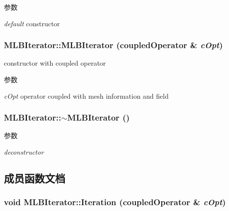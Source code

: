 \begin{DoxyParams}{参数}
\item[{\em default}]constructor \end{DoxyParams}
\hypertarget{classMLBIterator_a3ebc135eabdafb635d1b07b7138d5312}{
\subsubsection[{MLBIterator}]{\setlength{\rightskip}{0pt plus 5cm}MLBIterator::MLBIterator (coupledOperator \& {\em cOpt})}}
\label{classMLBIterator_a3ebc135eabdafb635d1b07b7138d5312}


constructor with coupled operator 
\begin{DoxyParams}{参数}
\item[{\em cOpt}]operator coupled with mesh information and field \end{DoxyParams}
\hypertarget{classMLBIterator_adf1f2571a69820fefe660ad605b4378b}{
\subsubsection[{$\sim$MLBIterator}]{\setlength{\rightskip}{0pt plus 5cm}MLBIterator::$\sim$MLBIterator ()}}
\label{classMLBIterator_adf1f2571a69820fefe660ad605b4378b}

\begin{DoxyParams}{参数}
\item[{\em deconstructor}]\end{DoxyParams}


\subsection{成员函数文档}
\hypertarget{classMLBIterator_a05e27d9c7ccc97d8e340a9f7ecba14ff}{
\subsubsection[{Iteration}]{\setlength{\rightskip}{0pt plus 5cm}void MLBIterator::Iteration (coupledOperator \& {\em cOpt})}}
\label{classMLBIterator_a05e27d9c7ccc97d8e340a9f7ecba14ff}


